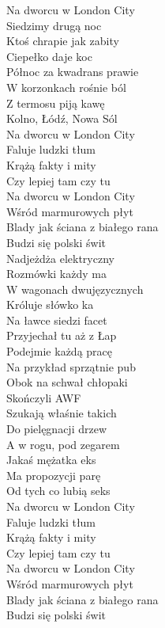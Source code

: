 \begin{text}
    Na dworcu w London City\\
    Siedzimy drugą noc\\
    Ktoś chrapie jak zabity\\
    Ciepełko daje koc\\
    Północ za kwadrans prawie\\
    W korzonkach rośnie ból\\
    Z termosu piją kawę\\
    Kolno, Łódź, Nowa Sól\\
    Na dworcu w London City\\
    Faluje ludzki tłum\\
    Krążą fakty i mity\\
    Czy lepiej tam czy tu\\
    Na dworcu w London City\\
    Wśród marmurowych płyt\\
    Blady jak ściana z białego rana\\
    Budzi się polski świt\\
    Nadjeżdża elektryczny\\
    Rozmówki każdy ma\\
    W wagonach dwujęzycznych\\
    Króluje słówko ka\\
    Na ławce siedzi facet\\
    Przyjechał tu aż z Łap\\
    Podejmie każdą pracę\\
    Na przykład sprzątnie pub\\
    Obok na schwał chłopaki\\
    Skończyli AWF\\
    Szukają właśnie takich\\
    Do pielęgnacji drzew\\
    A w rogu, pod zegarem\\
    Jakaś mężatka eks\\
    Ma propozycji parę\\
    Od tych co lubią seks\\
    Na dworcu w London City\\
    Faluje ludzki tłum\\
    Krążą fakty i mity\\
    Czy lepiej tam czy tu\\
    Na dworcu w London City\\
    Wśród marmurowych płyt\\
    Blady jak ściana z białego rana\\
    Budzi się polski świt
\end{text}
\begin{chord}

\end{chord}